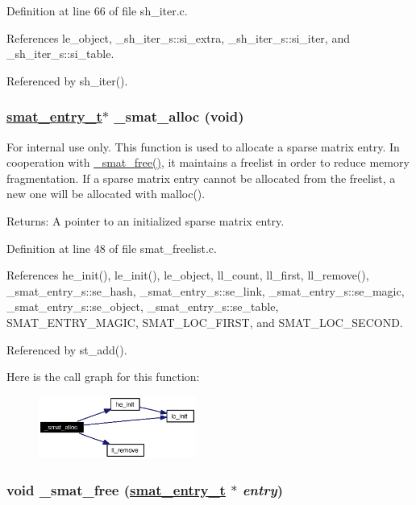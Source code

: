 Definition at line 66 of file sh\_\-iter.c.

References le\_\-object, \_\-sh\_\-iter\_\-s::si\_\-extra, \_\-sh\_\-iter\_\-s::si\_\-iter, and \_\-sh\_\-iter\_\-s::si\_\-table.

Referenced by sh\_\-iter().\hypertarget{group__dbprim__smat_ga24}{
\subsubsection[\_\-smat\_\-alloc]{\setlength{\rightskip}{0pt plus 5cm}\hyperlink{struct__smat__entry__s}{smat\_\-entry\_\-t}$\ast$ \_\-smat\_\-alloc (void)}}
\label{group__dbprim__smat_ga24}


\begin{Desc}
\item[For internal use only.]
This function is used to allocate a sparse matrix entry. In cooperation with \hyperlink{group__dbprim__smat_ga25}{\_\-smat\_\-free()}, it maintains a freelist in order to reduce memory fragmentation. If a sparse matrix entry cannot be allocated from the freelist, a new one will be allocated with malloc().

\begin{Desc}
\item[Returns:]A pointer to an initialized sparse matrix entry.\end{Desc}
\end{Desc}


Definition at line 48 of file smat\_\-freelist.c.

References he\_\-init(), le\_\-init(), le\_\-object, ll\_\-count, ll\_\-first, ll\_\-remove(), \_\-smat\_\-entry\_\-s::se\_\-hash, \_\-smat\_\-entry\_\-s::se\_\-link, \_\-smat\_\-entry\_\-s::se\_\-magic, \_\-smat\_\-entry\_\-s::se\_\-object, \_\-smat\_\-entry\_\-s::se\_\-table, SMAT\_\-ENTRY\_\-MAGIC, SMAT\_\-LOC\_\-FIRST, and SMAT\_\-LOC\_\-SECOND.

Referenced by st\_\-add().

Here is the call graph for this function:\begin{figure}[H]
\begin{center}
\leavevmode
\includegraphics[width=146pt]{group__dbprim__smat_ga24_cgraph}
\end{center}
\end{figure}
\hypertarget{group__dbprim__smat_ga25}{
\subsubsection[\_\-smat\_\-free]{\setlength{\rightskip}{0pt plus 5cm}void \_\-smat\_\-free (\hyperlink{struct__smat__entry__s}{smat\_\-entry\_\-t} $\ast$ {\em entry})}}
\label{group__dbprim__smat_ga25}


